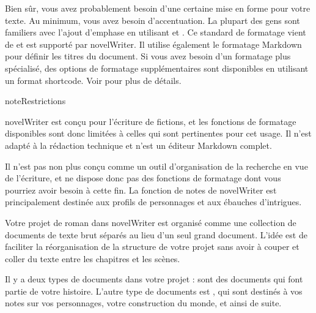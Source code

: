 \documentclass[a4paper,11pt,french]{sphinxmanual}
\begin{document}
\sphinxAtStartPar
Bien sûr, vous avez probablement besoin d’une certaine mise en forme pour votre texte. Au minimum, vous avez besoin d’accentuation. La plupart des gens sont familiers avec l’ajout d’emphase en utilisant  et . Ce standard de formatage vient de  et est supporté par novelWriter. Il utilise également le formatage Markdown pour définir les titres du document. Si vous avez besoin d’un formatage plus spécialisé, des options de formatage supplémentaires sont disponibles en utilisant un format shortcode. Voir {\hyperref[\detokenize{usage_format:a-fmt-shortcodes}]{}} pour plus de détails.

\begin{sphinxadmonition}{note}{Restrictions}

\sphinxAtStartPar
novelWriter est conçu pour l’écriture de fictions, et les fonctions de formatage disponibles sont donc limitées à celles qui sont pertinentes pour cet usage. Il n’est  adapté à la rédaction technique et n’est  un éditeur Markdown complet.

\sphinxAtStartPar
Il n’est pas non plus conçu comme un outil d’organisation de la recherche en vue de l’écriture, et ne dispose donc pas des fonctions de formatage dont vous pourriez avoir besoin à cette fin. La fonction de notes de novelWriter est principalement destinée aux profils de personnages et aux ébauches d’intrigues.
\end{sphinxadmonition}

\sphinxAtStartPar
Votre projet de roman dans novelWriter est organisé comme une collection de documents de texte brut séparés au lieu d’un seul grand document. L’idée est de faciliter la réorganisation de la structure de votre projet sans avoir à couper et coller du texte entre les chapitres et les scènes.

\sphinxAtStartPar
Il y a deux types de documents dans votre projet : {\hyperref[\detokenize{int_glossary:term-Novel-Documents}]{}} sont des documents qui font partie de votre histoire. L’autre type de documents est {\hyperref[\detokenize{int_glossary:term-Project-Notes}]{}}, qui sont destinés à vos notes sur vos personnages, votre construction du monde, et ainsi de suite.
\end{document}
